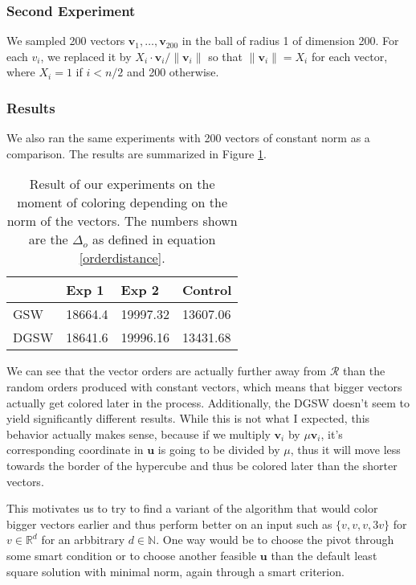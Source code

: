 \documentclass[12pt]{article}
\begin{document}
\subsubsection{Second Experiment}
We sampled 200 vectors $\textbf{v}_1,\dots,\textbf{v}_{200}$ in the ball of radius 1 of dimension 200. For each $v_i$, we replaced it by $X_i\cdot \textbf{v}_i/\|\textbf{v}_i\|$ so that $\|\textbf{v}_i\|=X_i$ for each vector, where $X_i=1$ if $i<n/2$ and 200 otherwise.

\subsubsection{Results}
We also ran the same experiments with 200 vectors of constant norm as a comparison. The results are summarized in Figure \ref{norm_when_colored}.
\begin{center}
\begin{table}[h]
\begin{tabular}{l|lll}
     & Exp 1   & Exp 2    & Control  \\
\hline
GSW  & 18664.4 & 19997.32 & 13607.06 \\
DGSW & 18641.6 & 19996.16 & 13431.68
\end{tabular}
\caption{Result of our experiments on the moment of coloring depending on the norm of the vectors. The numbers shown are the $\Delta_o$ as defined in equation \ref{orderdistance}.}
\label{norm_when_colored}
\end{table}
\end{center}

We can see that the vector orders are actually further away from $\mathcal{R}$ than the random orders produced with constant vectors, which means that bigger vectors actually get colored later in the process. Additionally, the DGSW doesn't seem to yield significantly different results. While this is not what I expected, this behavior actually makes sense, because if we multiply $\textbf{v}_i$ by $\mu\textbf{v}_i$, it's corresponding coordinate in $\textbf{u}$ is going to be divided by $\mu$, thus it will move less towards the border of the hypercube and thus be colored later than the shorter vectors.

This motivates us to try to find a variant of the algorithm that would color bigger vectors earlier and thus perform better on an input such as $\{v,v,v,3v\}$ for $v\in\mathbb{R}^d$ for an arbbitrary $d\in\mathbb{N}$. One way would be to choose the pivot through some smart condition or to choose another feasible $\textbf{u}$ than the default least square solution with minimal norm, again through a smart criterion.
\end{document}

